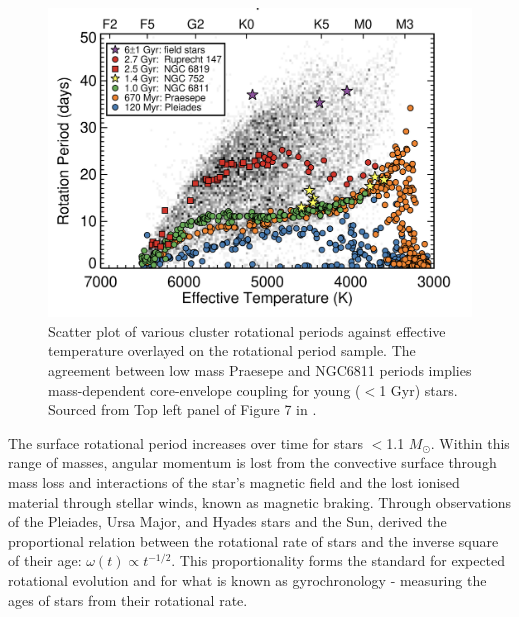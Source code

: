 \begin{figure}[h]
    \includegraphics[width=\textwidth]{Figures/intro_figures/cluster_kepler.png}
    \caption[Cluster rotational periods against effective temperature]{Scatter plot of various cluster rotational periods against effective temperature overlayed on the \kepler{} \citep{mcquillan_rotation_2014} rotational period sample.
    The agreement between low mass Praesepe and NGC6811 periods implies mass-dependent core-envelope coupling for young ($<$1 Gyr) stars.
    Sourced from Top left panel of Figure 7 in \citet{curtis_when_2020}.}
    \label{fig:cluster_rotational_periods}
\end{figure}

The surface rotational period increases over time for stars $<$1.1 $M_{\odot}$.
Within this range of masses, angular momentum is lost from the convective surface through mass loss and interactions of the star's magnetic field and the lost ionised material through stellar winds, known as magnetic braking.
Through observations of the Pleiades, Ursa Major, and Hyades stars and the Sun, \citet{skumanich_time_1972} derived the proportional relation between the rotational rate of stars and the inverse square of their age: $\omega(t) \propto t^{-1/2}$.
This proportionality forms the standard for expected rotational evolution and for what is known as gyrochronology - measuring the ages of stars from their rotational rate.


